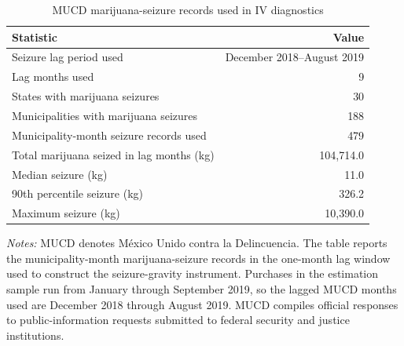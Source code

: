 \begin{table}[H]
\centering
\caption{MUCD marijuana-seizure records used in IV diagnostics}
\label{tab:appendix-mucd}
\begin{threeparttable}
\begin{tabular}{lr}
\toprule
Statistic & Value\\
\midrule
Seizure lag period used & December 2018--August 2019\\
Lag months used & 9\\
States with marijuana seizures & 30\\
Municipalities with marijuana seizures & 188\\
Municipality-month seizure records used & 479\\
Total marijuana seized in lag months (kg) & 104,714.0\\
Median seizure (kg) & 11.0\\
90th percentile seizure (kg) & 326.2\\
Maximum seizure (kg) & 10,390.0\\
\bottomrule
\end{tabular}
\begin{tablenotes}[flushleft]\small
\item \textit{Notes:} MUCD denotes M\'{e}xico Unido contra la Delincuencia. The table reports the municipality-month marijuana-seizure records in the one-month lag window used to construct the seizure-gravity instrument. Purchases in the estimation sample run from January through September 2019, so the lagged MUCD months used are December 2018 through August 2019. MUCD compiles official responses to public-information requests submitted to federal security and justice institutions.
\end{tablenotes}
\end{threeparttable}
\end{table}
